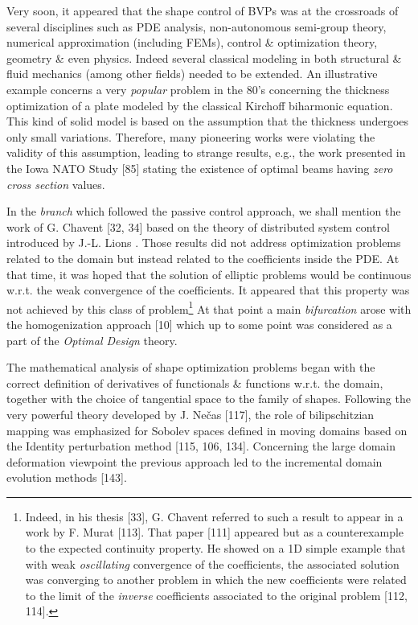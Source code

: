 \documentclass[oneside]{book}
\numberwithin{equation}{section}
\begin{document}
Very soon, it appeared that the shape control of BVPs was at the crossroads of several disciplines such as PDE analysis, non-autonomous semi-group theory, numerical approximation (including FEMs), control \& optimization theory, geometry \& even physics. Indeed several classical modeling in both structural \& fluid mechanics (among other fields) needed to be extended. An illustrative example concerns a very \textit{popular} problem in the 80's concerning the thickness optimization of a plate modeled by the classical Kirchoff biharmonic equation. This kind of solid model is based on the assumption that the thickness undergoes only small variations. Therefore, many pioneering works were violating the validity of this assumption, leading to strange results, e.g., the work presented in the Iowa NATO Study [85] stating the existence of optimal beams having \textit{zero cross section} values.

In the \textit{branch} which followed the passive control approach, we shall mention the work of G. Chavent [32, 34] based on the theory of distributed system control introduced by J.-L. Lions \cite{Lions1971}. Those results did not address optimization problems related to the domain but instead related to the coefficients inside the PDE. At that time, it was hoped that the solution of elliptic problems would be continuous w.r.t. the weak convergence of the coefficients. It appeared that this property was not achieved by this class of problem\footnote{Indeed, in his thesis [33], G. Chavent referred to such a result to appear in a work by F. Murat [113]. That paper [111] appeared but as a counterexample to the expected continuity property. He showed on a 1D simple example that with weak \textit{oscillating} convergence of the coefficients, the associated solution was converging to another problem in which the new coefficients were related to the limit of the \textit{inverse} coefficients associated to the original problem [112, 114].} At that point a main \textit{bifurcation} arose with the homogenization approach [10] which up to some point was considered as a part of the \textit{Optimal Design} theory.

The mathematical analysis of shape optimization problems began with the correct definition of derivatives of functionals \& functions w.r.t. the domain, together with the choice of tangential space to the family of shapes. Following the very powerful theory developed by J. Ne\v{c}as [117], the role of bilipschitzian mapping was emphasized for Sobolev spaces defined in moving domains based on the Identity perturbation method [115, 106, 134]. Concerning the large domain deformation viewpoint the previous approach led to the incremental domain evolution methods [143].
\end{document}
